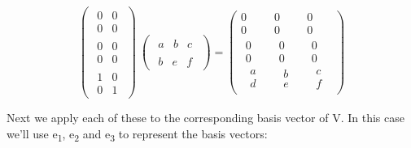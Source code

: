 \documentclass[oneside,english]{amsbook}
\numberwithin{section}{chapter}
\theoremstyle{plain}
\theoremstyle{definition}
\begin{document}
\[{\begin{pmatrix}
\begin{matrix}
			0 & 0 \\
			0 & 0
		\end{matrix} \\
		\begin{matrix}
			0 & 0 \\
			0 & 0
		\end{matrix} \\
		\begin{matrix}
			1 & 0 \\
			0 & 1
		\end{matrix}
	\end{pmatrix}\ \begin{pmatrix}
		\begin{matrix}
			a & b & c
		\end{matrix} \\
		\begin{matrix}
			b & e & f
		\end{matrix}
	\end{pmatrix} = \begin{pmatrix}
		0 & 0 & 0 \\
		0 & 0 & 0 \\
		\begin{matrix}
			0 \\
			0 \\
			\begin{matrix}
				a \\
				d
			\end{matrix}
		\end{matrix} & \begin{matrix}
			0 \\
			0 \\
			\begin{matrix}
				b \\
				e
			\end{matrix}
		\end{matrix} & \begin{matrix}
			0 \\
			0 \\
			\begin{matrix}
				c \\
				f
			\end{matrix}
		\end{matrix}
\end{pmatrix}}\]

Next we apply each of these to the corresponding basis vector of V. In
this case we'll use e\textsubscript{1}, e\textsubscript{2} and
e\textsubscript{3} to represent the basis vectors:
\end{document}
